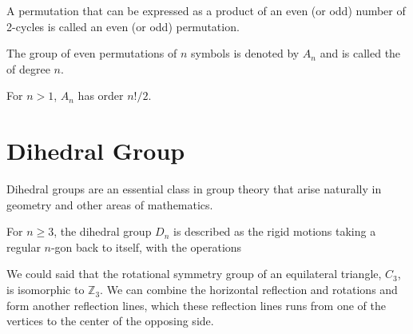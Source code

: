 \begin{definition}
    A permutation that can be expressed as a product of an even (or odd) number of 2-cycles is called an even (or odd) 
    permutation.
\end{definition}

\begin{definition}
    The group of even permutations of $n$ symbols is denoted by $A_n$ and is called the  of 
    degree $n$.
\end{definition}

\begin{theorem}
    For $n > 1$, $A_n$ has order $n!/2$.
\end{theorem}

\section{Dihedral Group}

Dihedral groups are an essential class in group theory that arise naturally in geometry and other areas of mathematics.

For $n \geq 3$, the dihedral group $D_n$ is described as the rigid motions taking a regular 
$n$-gon back to itself, with the operations 

We could said that the rotational symmetry group of an equilateral triangle, $C_3$, is isomorphic to
$\mathbb{Z}_3$. We can combine the horizontal reflection and rotations and form another reflection lines, 
which these reflection lines runs from one of the vertices to the center of the opposing side.

